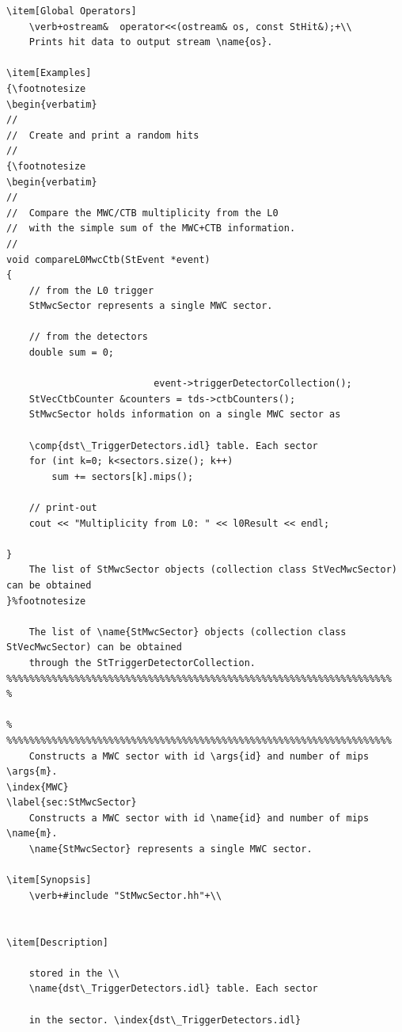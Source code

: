 \begin{Entry}
{\begin{verbatim}
\item[Global Operators]
    \verb+ostream&  operator<<(ostream& os, const StHit&);+\\
    Prints hit data to output stream \name{os}.

\item[Examples]
{\footnotesize
\begin{verbatim}
//
//  Create and print a random hits
//
{\footnotesize
\begin{verbatim}
//
//  Compare the MWC/CTB multiplicity from the L0
//  with the simple sum of the MWC+CTB information.
//
void compareL0MwcCtb(StEvent *event)
{
    // from the L0 trigger
    StMwcSector represents a single MWC sector.

    // from the detectors
    double sum = 0;
    
                          event->triggerDetectorCollection();
    StVecCtbCounter &counters = tds->ctbCounters();
    StMwcSector holds information on a single MWC sector as
  
    \comp{dst\_TriggerDetectors.idl} table. Each sector
    for (int k=0; k<sectors.size(); k++)
        sum += sectors[k].mips();

    // print-out
    cout << "Multiplicity from L0: " << l0Result << endl;
    
}
    The list of StMwcSector objects (collection class StVecMwcSector) can be obtained
}%footnotesize

    The list of \name{StMwcSector} objects (collection class StVecMwcSector) can be obtained
    through the StTriggerDetectorCollection.
%%%%%%%%%%%%%%%%%%%%%%%%%%%%%%%%%%%%%%%%%%%%%%%%%%%%%%%%%%%%%%%%%%%%
%
   
%
%%%%%%%%%%%%%%%%%%%%%%%%%%%%%%%%%%%%%%%%%%%%%%%%%%%%%%%%%%%%%%%%%%%%
    Constructs a MWC sector with id \args{id} and number of mips \args{m}.
\index{MWC}
\label{sec:StMwcSector}
    Constructs a MWC sector with id \name{id} and number of mips \name{m}.
    \name{StMwcSector} represents a single MWC sector.

\item[Synopsis]
    \verb+#include "StMwcSector.hh"+\\
    

\item[Description]
    
    stored in the \\
    \name{dst\_TriggerDetectors.idl} table. Each sector
    
    in the sector. \index{dst\_TriggerDetectors.idl}


\end{verbatim}}
\end{Entry}

